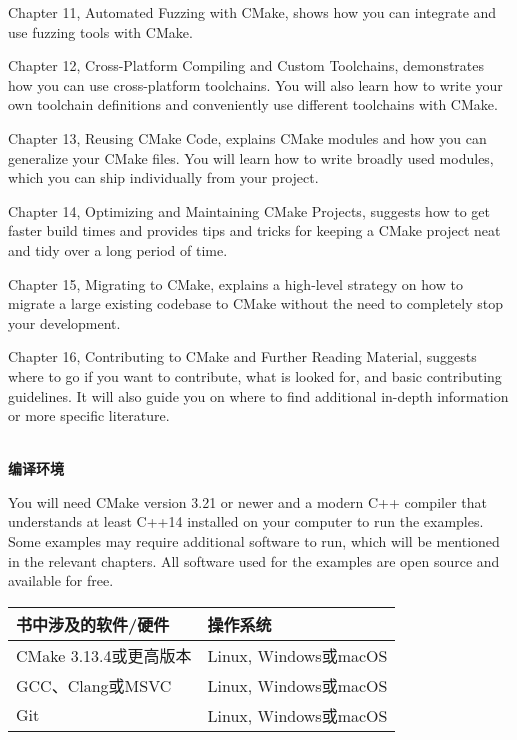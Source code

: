 Chapter 11, Automated Fuzzing with CMake, shows how you can integrate and use fuzzing tools with CMake.

Chapter 12, Cross-Platform Compiling and Custom Toolchains, demonstrates how you can use cross-platform toolchains. You will also learn how to write your own toolchain definitions and conveniently use different toolchains with CMake.

Chapter 13, Reusing CMake Code, explains CMake modules and how you can generalize your CMake files. You will learn how to write broadly used modules, which you can ship individually from your project.

Chapter 14, Optimizing and Maintaining CMake Projects, suggests how to get faster build times and provides tips and tricks for keeping a CMake project neat and tidy over a long period of time. 

Chapter 15, Migrating to CMake, explains a high-level strategy on how to migrate a large existing codebase to CMake without the need to completely stop your development.

Chapter 16, Contributing to CMake and Further Reading Material, suggests where to go if you want to contribute, what is looked for, and basic contributing guidelines. It will also guide you on where to find additional in-depth information or more specific literature.

\hspace*{\fill} \\ %
\textbf{编译环境}

You will need CMake version 3.21 or newer and a modern C++ compiler that understands at least C++14 installed on your computer to run the examples. Some examples may require additional software to run, which will be mentioned in the relevant chapters. All software used for the examples are open source and available for free.

\begin{table}[H]
	\centering
	\begin{tabular}{|l|l|}
		\hline
		书中涉及的软件/硬件                                                                                                                  & 操作系统                                                             \\ \hline
		CMake 3.13.4或更高版本                                                                                                                                  &                                                                           Linux, Windows或macOS       \\  \hline
		GCC、Clang或MSVC              &                                                                                  Linux, Windows或macOS\\  \hline
		Git  &  Linux, Windows或macOS                                                                                \\ \hline
	\end{tabular}
\end{table}

